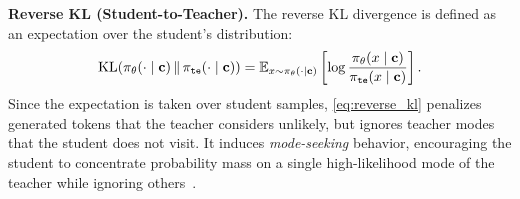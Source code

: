 

\textbf{Reverse KL (Student-to-Teacher).}
The reverse KL divergence is defined as an expectation over the student's distribution:
\begin{equation}
\label{eq:reverse_kl}
\mathrm{KL}
(\pi_{\theta}(\cdot\mid\mathbf{c}) \,\|\, \pi_{\tt{te}}(\cdot\mid\mathbf{c}))= \mathbb{E}_{x \sim \pi_\theta(\cdot \mid \mathbf{c})} \left[ \log \frac{\pi_\theta(x \mid \mathbf{c})}{\pi_{\tt{te}}(x \mid \mathbf{c})} \right].
\end{equation}
Since the expectation is taken over student samples, \eqref{eq:reverse_kl} penalizes generated tokens that the teacher considers unlikely, but ignores teacher modes that the student does not visit. It induces \emph{mode-seeking} behavior, encouraging the student to concentrate probability mass on a single high-likelihood mode of the teacher while ignoring others~\cite{minka2005divergence}.


